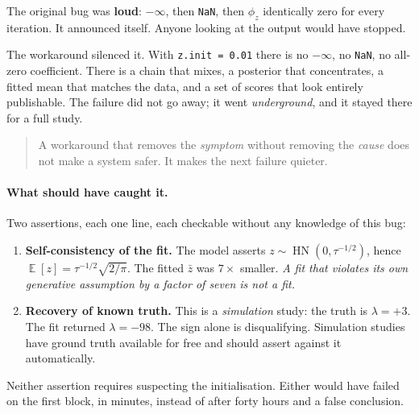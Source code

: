 \documentclass[11pt]{article}
\newcommand{\code}[1]{\texttt{#1}}
\DeclareMathOperator{\hn}{HN}
\DeclareMathOperator{\E}{\mathbb{E}}
\begin{document}
The original bug was \textbf{loud}: $-\infty$, then \code{NaN}, then $\phi_z$
identically zero for every iteration. It announced itself. Anyone looking at the
output would have stopped.

The workaround silenced it. With \code{z.init = 0.01} there is no $-\infty$, no
\code{NaN}, no all-zero coefficient. There is a chain that mixes, a posterior
that concentrates, a fitted mean that matches the data, and a set of scores that
look entirely publishable. The failure did not go away; it went
\emph{underground}, and it stayed there for a full study.

\begin{quote}
A workaround that removes the \emph{symptom} without removing the \emph{cause}
does not make a system safer. It makes the next failure quieter.
\end{quote}

\paragraph{What should have caught it.} Two assertions, each one line, each
checkable without any knowledge of this bug:

\begin{enumerate}\itemsep2pt
  \item \textbf{Self-consistency of the fit.} The model asserts $z \sim
        \hn(0,\tau^{-1/2})$, hence $\E[z] = \tau^{-1/2}\sqrt{2/\pi}$. The fitted
        $\bar z$ was $7\times$ smaller. \emph{A fit that violates its own
        generative assumption by a factor of seven is not a fit.}
  \item \textbf{Recovery of known truth.} This is a \emph{simulation} study: the
        truth is $\lambda = +3$. The fit returned $\lambda = -98$. The sign alone
        is disqualifying. Simulation studies have ground truth available for free
        and should assert against it automatically.
\end{enumerate}

Neither assertion requires suspecting the initialisation. Either would have
failed on the first block, in minutes, instead of after forty hours and a false
conclusion.
\end{document}
